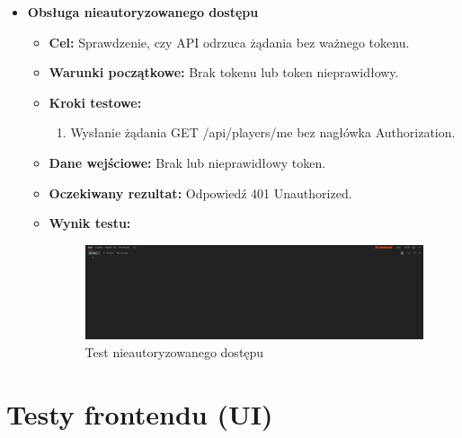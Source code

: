 \begin{itemize}
    \item \textbf{Obsługa nieautoryzowanego dostępu}
    \begin{itemize}
        \item \textbf{Cel:} Sprawdzenie, czy API odrzuca żądania bez ważnego tokenu.
        \item \textbf{Warunki początkowe:} Brak tokenu lub token nieprawidłowy.
        \item \textbf{Kroki testowe:}
        \begin{enumerate}
            \item Wysłanie żądania GET /api/players/me bez nagłówka Authorization.
        \end{enumerate}
        \item \textbf{Dane wejściowe:} Brak lub nieprawidłowy token.
        \item \textbf{Oczekiwany rezultat:} Odpowiedź 401 Unauthorized.
        \item \textbf{Wynik testu:}
        \begin{figure}[H]
            \includegraphics[width=480px]{figures/testy/test-unauthorized.png}
            \caption{Test nieautoryzowanego dostępu}
        \end{figure}
    \end{itemize}
\end{itemize}

\section{Testy frontendu (UI)}


